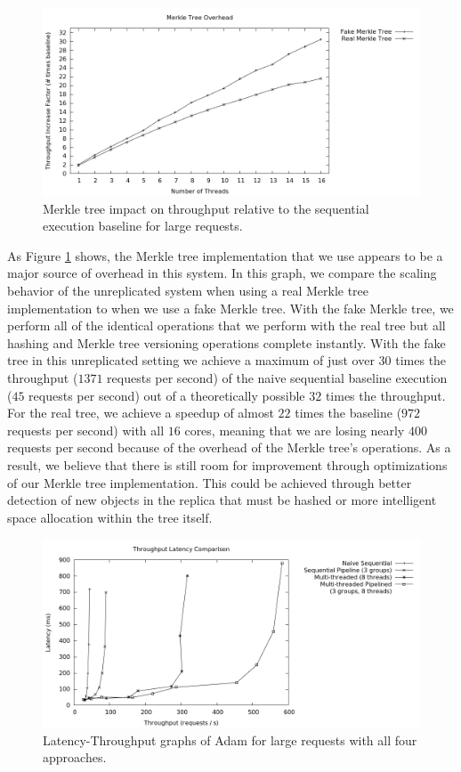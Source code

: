 \documentclass[11pt, oneside]{report}
\begin{document}
\begin{figure}[h]
\centering
\includegraphics[width=1.0\textwidth]{graphs/merkleimpact/graph.png}
\caption{\label{scalingmedmerkletree}Merkle tree impact on throughput relative to the sequential execution baseline for large requests.}
\end{figure}

As Figure \ref{scalingmedmerkletree} shows, the Merkle tree implementation that we use appears to be a major source of overhead in this system.
In this graph, we compare the scaling behavior of the unreplicated system when using a real Merkle tree implementation to when we use a fake Merkle tree.
With the fake Merkle tree, we perform all of the identical operations that we perform with the real tree but all hashing and Merkle tree versioning operations complete instantly.
With the fake tree in this unreplicated setting we achieve a maximum of just over $30$ times the throughput ($1371$ requests per second) of the naive sequential baseline execution ($45$ requests per second) out of a theoretically possible $32$ times the throughput.
For the real tree, we achieve a speedup of almost $22$ times the baseline ($972$ requests per second) with all $16$ cores, meaning that we are losing nearly $400$ requests per second because of the overhead of the Merkle tree's operations.
As a result, we believe that there is still room for improvement through optimizations of our Merkle tree implementation.
This could be achieved through better detection of new objects in the replica that must be hashed or more intelligent space allocation within the tree itself.

\begin{figure}[h]
\centering
\includegraphics[width=1.0\textwidth]{graphs/latencythroughput/graph.png}
\caption{\label{head2head}Latency-Throughput graphs of Adam for large requests with all four approaches.}
\end{figure}
\end{document}
